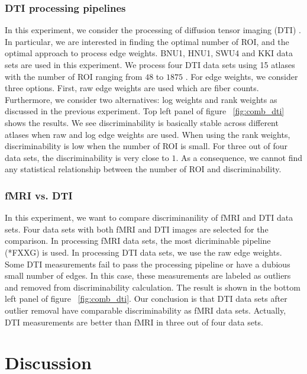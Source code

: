 \documentclass{article}
\begin{document}
\subsubsection{DTI processing pipelines}
In this experiment, we consider the processing of diffusion tensor imaging (DTI) \cite{westin2002processing}. In particular, we are interested in finding the optimal number of ROI, and the optimal approach to process edge weights. BNU1, HNU1, SWU4 and KKI data sets are used in this experiment. We process four DTI data sets using 15 atlases with the number of ROI ranging from $48$ to $1875$ \cite{mori2005mri}. For edge weights, we consider three options. First, raw edge weights are used which are fiber counts. Furthermore, we consider two alternatives: log weights and rank weights as discussed in the previous experiment. Top left panel of figure ~\ref{fig:comb_dti} shows the results. We see discriminability is basically stable across different atlases when raw and log edge weights are used. When using the rank weights, discriminability is low when the number of ROI is small. For three out of four data sets, the discriminability is very close to $1$. As a consequence, we cannot find any statistical relationship between the number of ROI and discriminability.




\subsubsection{fMRI vs. DTI}
In this experiment, we want to compare discriminanility of fMRI and DTI data sets. Four data sets with both fMRI and DTI images are selected for the comparison. In processing fMRI data sets, the most dicriminable pipeline (*FXXG) is used. In processing DTI data sets, we use the raw edge weights. Some DTI measurements fail to pass the processing pipeline or have a dubious small number of edges. In this case, these measurements are labeled as outliers and removed from discriminability calculation. The result is shown in the bottom left panel of figure ~\ref{fig:comb_dti}. Our conclusion is that DTI data sets after outlier removal have comparable discriminability as fMRI data sets. Actually, DTI measurements are better than fMRI in three out of four data sets. 



\section{Discussion}
\end{document}
